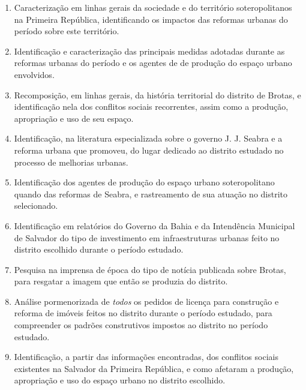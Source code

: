 \begin{enumerate}
\item Caracterização em linhas gerais da sociedade e do território soteropolitanos na Primeira República, identificando os impactos das reformas urbanas do período sobre este território.
\item Identificação e caracterização das principais medidas adotadas durante as reformas urbanas do período e os agentes de de produção do espaço urbano envolvidos.
\item Recomposição, em linhas gerais, da história territorial do distrito de Brotas, e identificação nela dos conflitos sociais recorrentes, assim como a produção, apropriação e uso de seu espaço.
\item Identificação, na literatura especializada sobre o governo J. J. Seabra e a reforma urbana que promoveu, do lugar dedicado ao distrito estudado no processo de melhorias urbanas.
\item Identificação dos agentes de produção do espaço urbano soteropolitano quando das reformas de Seabra, e rastreamento de sua atuação no distrito selecionado.
\item Identificação em relatórios do Governo da Bahia e da Intendência Municipal de Salvador do tipo de investimento em infraestruturas urbanas feito no distrito escolhido durante o período estudado.
\item Pesquisa na imprensa de época do tipo de notícia publicada sobre Brotas, para resgatar a imagem que então se produzia do distrito.
\item Análise pormenorizada de \textit{todos} os pedidos de licença para construção e reforma de imóveis feitos no distrito durante o período estudado, para compreender os padrões construtivos impostos ao distrito no período estudado.
\item Identificação, a partir das informações encontradas, dos conflitos sociais existentes na Salvador da Primeira República, e como afetaram a produção, apropriação e uso do espaço urbano no distrito escolhido.
\end{enumerate}

